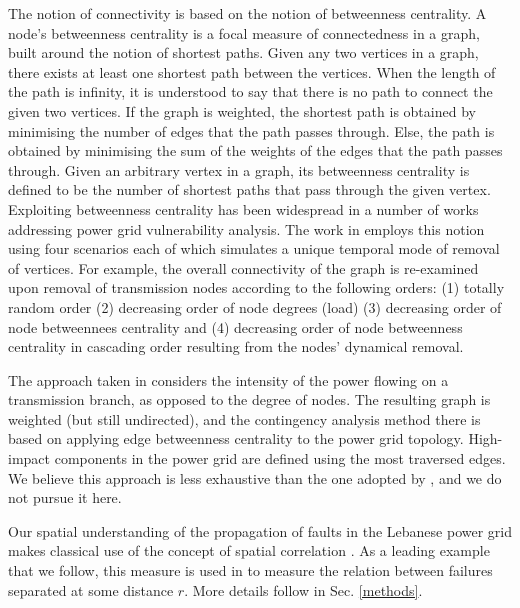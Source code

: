 The notion of connectivity is based on the notion of betweenness centrality. A node's betweenness centrality is a focal measure of connectedness in a graph, built around the notion of shortest paths. Given any two vertices in a graph, there exists at least one shortest path between the vertices. When the length of the path is infinity, it is understood to say that there is no path to connect the given two vertices. If the graph is weighted, the shortest path is obtained by minimising the number of edges that the path passes through. Else, the path is obtained by minimising the sum of the weights of the edges that the path passes through. Given an arbitrary vertex in a graph, its betweenness centrality is defined to be the number of shortest paths that pass through the given vertex. Exploiting betweenness centrality has been widespread in a number of works addressing power grid vulnerability analysis. The work in \cite{2000Natur.406..378A} employs this notion using four scenarios each of which simulates a unique temporal mode of removal of vertices. For example, the overall connectivity of the graph is re-examined upon removal of transmission nodes according to the following orders: (1) totally random order (2) decreasing order of node degrees (load) (3) decreasing order of node betweennees centrality and (4) decreasing order of node betweenness centrality in cascading order resulting from the nodes' dynamical removal. 

The approach taken in \cite{JinAl10} considers the intensity of the power flowing on a transmission branch, as opposed to the degree of nodes. The resulting graph is weighted (but still undirected), and the contingency analysis method there is based on applying edge betweenness centrality \cite{GirvanAl02} to the power grid topology. High-impact components in the power grid are defined using the most traversed edges. We believe this approach is less exhaustive than the one adopted by \cite{2000Natur.406..378A}, and we do not pursue it here.

Our spatial understanding of the propagation of faults in the Lebanese power grid makes classical use of the concept of spatial correlation \cite{CavagnaAl10, MakseAl95}. As a leading example that we follow, this measure is used in \cite{DaqingAl14} to measure the relation between failures separated at some distance $r$. More details follow in Sec. \ref{methods}.


